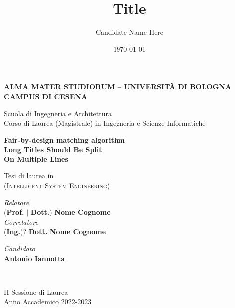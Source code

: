 \title{Title}
\author{Candidate Name Here}
\date{\today}

\begin{titlepage}
	\begin{center}
		
		\large
		\textbf{ALMA MATER STUDIORUM -- UNIVERSITÀ DI BOLOGNA \\ CAMPUS DI CESENA}
		\\
		\noindent\hrulefill
		\vspace{0.4cm}
		
		\Large
		Scuola di Ingegneria e Architettura \\
		Corso di Laurea (Magistrale) in Ingegneria e Scienze Informatiche
		
		\Huge
		\vspace{4cm}
		\textbf{
			Fair-by-design matching algorithm
			\\
			Long Titles Should Be Split
			\\
			On Multiple Lines
		}
		
		\large
		\vspace{1cm}
		Tesi di laurea in 
		\\
		\textsc{(Intelligent System Engineering)}
		
		\vspace{5.5cm}
		\begin{minipage}[t]{0.64\textwidth}
			\begin{flushleft}
				\textit{Relatore} 
				\\ 
				(\textbf{Prof.} $\mid$ \textbf{Dott.}) \textbf{Nome Cognome}
				\\
				\vspace{0.4cm}
				\textit{Correlatore} 
				\\
				(\textbf{Ing.})? \textbf{Dott.} \textbf{Nome Cognome}
			\end{flushleft}
		\end{minipage}
		\begin{minipage}[t]{0.34\textwidth}
			\begin{flushright}
				\textit{Candidato} 
				\\ 
				\textbf{Antonio Iannotta}
			\end{flushright}
		\end{minipage}\\
		
		\vfill
		\noindent\hrulefill
		\vspace{0.3cm}
		\Large
		
		II Sessione di Laurea
		\\
		Anno Accademico 2022-2023
	\end{center}
\end{titlepage}
\restoregeometry
